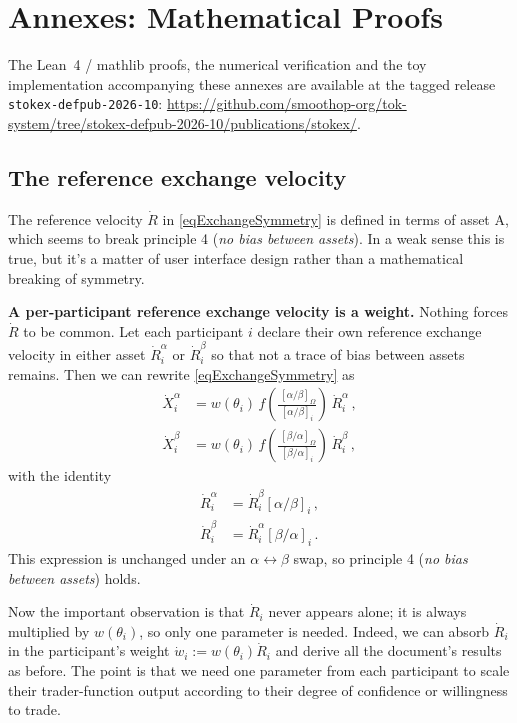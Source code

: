 \documentclass[letterpaper]{article}
\newcommand{\priceAB}{\left[\alpha / \beta\right]}
\newcommand{\priceBA}{\left[\beta / \alpha\right]}
\begin{document}
\section{Annexes: Mathematical Proofs}

The Lean~4 / mathlib proofs, the numerical verification and the toy implementation accompanying these annexes are available at the tagged release \texttt{stokex-defpub-2026-10}: \url{https://github.com/smoothop-org/tok-system/tree/stokex-defpub-2026-10/publications/stokex/}.

\subsection{The reference exchange velocity}\label{secReferenceVelocityBias}

The reference velocity $\dot{R}$ in \eqref{eqExchangeSymmetry} is defined in terms of asset A, which seems to break principle 4 (\emph{no bias between assets}).
In a weak sense this is true, but it's a matter of user interface design rather than a mathematical breaking of symmetry.

\textbf{A per-participant reference exchange velocity is a weight.} Nothing forces $\dot{R}$ to be common.
Let each participant $i$ declare their own reference exchange velocity in either asset $\dot{R}_i^\alpha$ or $\dot{R}_i^\beta$ so that not a trace of bias between assets remains.
Then we can rewrite \eqref{eqExchangeSymmetry} as
\begin{align*}
\dot{X}^\alpha_i &= w\!\left(\theta_i\right)\, f\!\left(\frac{\hspace{2pt}\priceAB_\Omega}{\priceAB_i} \right) \, \dot{R}_i^\alpha \, , \\
\dot{X}^\beta_i &=  w\!\left(\theta_i\right)\, f\!\left(\frac{\hspace{2pt}\priceBA_\Omega}{\priceBA_i} \right) \, \dot{R}_i^\beta \,,
\end{align*}
with the identity
\begin{align*}
    \dot{R}_i^\alpha &= \dot{R}_i^\beta \priceAB_i \, , \\
    \dot{R}_i^\beta &= \dot{R}_i^\alpha \priceBA_i \,.
\end{align*}
This expression is unchanged under an $\alpha \leftrightarrow \beta$ swap, so principle 4 (\emph{no bias between assets}) holds.

Now the important observation is that $\dot{R}_i$ never appears alone; it is always multiplied by $w\!\left(\theta_i\right)$, so only one parameter is needed.
Indeed, we can absorb $\dot{R}_i$ in the participant's weight $\dot{w}_i := w\!\left(\theta_i\right)\dot{R}_i$ and derive all the document's results as before.
The point is that we need one parameter from each participant to scale their trader-function output according to their degree of confidence or willingness to trade.
\end{document}
